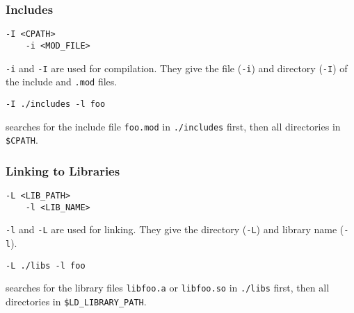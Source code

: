 \begin{frame}[fragile]
    \frametitle{Includes}
    \begin{lstlisting}[numbers=none]
    -I <CPATH>
    -i <MOD_FILE>
    \end{lstlisting}
    \texttt{-i} and \texttt{-I} are used for compilation. They give the file (\texttt{-i}) and directory (\texttt{-I}) of the include and \texttt{.mod} files.

    \begin{lstlisting}[numbers=none]
    -I ./includes -l foo
    \end{lstlisting}
    searches for the include file \texttt{foo.mod} in \texttt{./includes} first, then all directories in \texttt{\$CPATH}.
\end{frame}
\begin{frame}[fragile]
    \frametitle{Linking to Libraries}
    \begin{lstlisting}[numbers=none]
    -L <LIB_PATH>
    -l <LIB_NAME>
    \end{lstlisting}
    \texttt{-l} and \texttt{-L} are used for linking. They give the directory (\texttt{-L}) and library name (\texttt{-l}). 

    \begin{lstlisting}[numbers=none]
    -L ./libs -l foo
    \end{lstlisting}
    searches for the library files \texttt{libfoo.a} or \texttt{libfoo.so} in \texttt{./libs} first, then all directories in \texttt{\$LD\_LIBRARY\_PATH}.
\end{frame}
